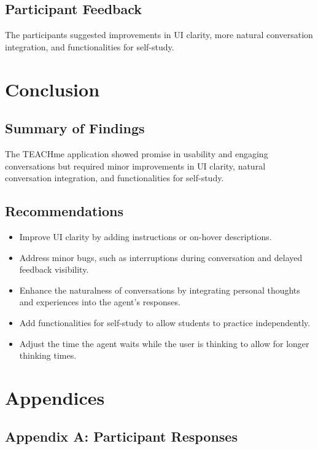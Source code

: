\documentclass{article}
\begin{document}
\subsection{Participant Feedback}
The participants suggested improvements in UI clarity, more natural conversation integration, and functionalities for self-study.

\section{Conclusion}

\subsection{Summary of Findings}
The TEACHme application showed promise in usability and engaging conversations but required minor improvements in UI clarity, natural conversation integration, and functionalities for self-study.

\subsection{Recommendations}
\begin{itemize}
    \item Improve UI clarity by adding instructions or on-hover descriptions.
    \item Address minor bugs, such as interruptions during conversation and delayed feedback visibility.
    \item Enhance the naturalness of conversations by integrating personal thoughts and experiences into the agent's responses.
    \item Add functionalities for self-study to allow students to practice independently.
    \item Adjust the time the agent waits while the user is thinking to allow for longer thinking times.
\end{itemize}

\section{Appendices}

\subsection{Appendix A: Participant Responses}
\end{document}
